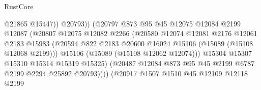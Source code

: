 \begin{lexlean}{RustCore}
\begin{coremodule}
                                            @21865
                                            @15447))
                                        @20793))
                                    (@20797
                                      @873
                                      @95
                                      @45
                                      @12075
                                      @12084
                                      @2199
                                      @12087
                                      (@20807
                                        @12075
                                        @12082
                                        @2266
                                        (@20580
                                          @12074
                                          @12081
                                          @2176
                                          @12061
                                          @2183
                                          @15983
                                          (@20594
                                            @822
                                            @2183
                                            @20600
                                            @16024
                                            @15106
                                            (@15089 (@15108 @12068 @2199)))
                                          @15106
                                          (@15089 (@15108 @12062 @12074)))
                                        @15304
                                        @15307
                                        @15310
                                        @15314
                                        @15319
                                        @15325)
                                      (@20487
                                        @12084
                                        @873
                                        @95
                                        @45
                                        @2199
                                        @6787
                                        @2199
                                        @2294
                                        @25892
                                        @20793))))
                                (@20917
                                  @1507
                                  @1510
                                  @45
                                  @12109
                                  @12118
                                  @2199

\end{coremodule}
\end{lexlean}
